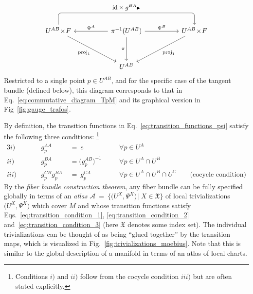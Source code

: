 \begin{equation}\label{cd:trivialization_general_trafo}
\begin{tikzcd}[row sep=3.5em, column sep=5.em]
    U^{AB}\!\times\!F
        \arrow[rd, "\proj_1"']
        \arrow[rr, rounded corners, to path={ 
                    -- ([yshift=4ex]\tikztostart.north) 
                    --node[above, pos=.5]{\small$\id \times g^{BA}\btr$} ([yshift=4ex]\tikztotarget.north) 
                    -- (\tikztotarget.north)
                    }]
    & \pi^{-1}(U^{AB})
        \arrow[d, swap, "\pi"]
        \arrow[l, "\Psi^A"']
        \arrow[r, "\Psi^B"]
    & U^{AB}\!\times\!F
        \arrow[ld, "\proj_1"]
    \\
    & U^{AB}
\end{tikzcd}
\end{equation}
Restricted to a single point $p\in U^{AB}$, and for the specific case of the tangent bundle (defined below), this diagram corresponds to that in Eq.~\eqref{eq:commutative_diagram_TpM} and its graphical version in Fig~\ref{fig:gauge_trafos}.


By definition, the transition functions in Eq.~\eqref{eq:transition_functions_psi} satisfy the following three conditions:%
\footnote{%
    Conditions $i)$ and $ii)$ follow from the cocycle condition $iii)$ but are often stated explicitly.
}
\begin{alignat}{3}
       i) \qquad&& g_p^{AA}         \;&=\ e                     \quad&&\forall p\in U^A \label{eq:transition_condition_1}\\
      ii) \qquad&& g_p^{BA}         \;&=\big(g_p^{AB}\big)^{-1} \quad&&\forall p\in U^A\cap U^B \label{eq:transition_condition_2}\\
     iii) \qquad&& g_p^{CB} g_p^{BA}\;&=\ g_p^{CA}              \quad&&\forall p\in U^A\cap U^B\cap U^C \qquad \text{(cocycle condition)} \label{eq:transition_condition_3}
\end{alignat}
By the \emph{fiber bundle construction theorem}, any fiber bundle can be fully specified globally in terms of an \emph{atlas}
$\mathscr{A}\ =\ \big\{\big( U^X, \Psi^X \big) \,\big|\, X\in\mathfrak{X} \big\}$
of local trivializations $\big(U^X,\Psi^X\big)$ which cover $M$ and whose transition functions satisfy Eqs.~\eqref{eq:transition_condition_1}, \eqref{eq:transition_condition_2} and~\eqref{eq:transition_condition_3} (here $\mathfrak{X}$ denotes some index set).
The individual trivializations can be thought of as being ``glued together'' by the transition maps, which is visualized in Fig.~\ref{fig:trivializations_moebius}.
Note that this is similar to the global description of a manifold in terms of an atlas of local charts.










